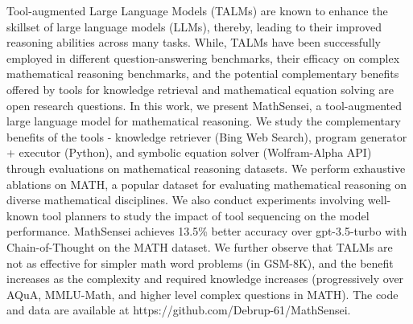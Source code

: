 Tool-augmented Large Language Models (TALMs) are known to enhance the skillset of large language models (LLMs), thereby, leading to their improved reasoning abilities across many tasks. While, TALMs have been successfully employed in different question-answering benchmarks, their efficacy on complex mathematical reasoning benchmarks, and the potential complementary benefits offered by tools for knowledge retrieval and mathematical equation solving are open research questions. In this work, we present MathSensei, a tool-augmented large language model for mathematical reasoning. We study the complementary benefits of the tools - knowledge retriever (Bing Web Search), program generator + executor (Python), and symbolic equation solver (Wolfram-Alpha API) through evaluations on mathematical reasoning datasets. We perform exhaustive ablations on MATH, a popular dataset for evaluating mathematical reasoning on diverse mathematical disciplines. We also conduct experiments involving well-known tool planners to study the impact of tool sequencing on the model performance. MathSensei achieves 13.5\% better accuracy over gpt-3.5-turbo with Chain-of-Thought on the MATH dataset. We further observe that TALMs are not as effective for simpler math word problems (in GSM-8K), and the benefit increases as the complexity and required knowledge increases (progressively over AQuA, MMLU-Math, and higher level complex questions in MATH). The code and data are available at https://github.com/Debrup-61/MathSensei.